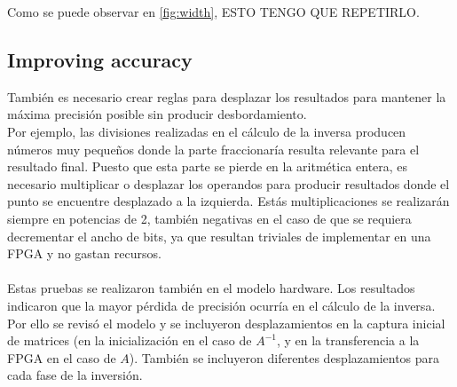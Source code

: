 Como se puede observar en \autoref{fig:width}, ESTO TENGO QUE REPETIRLO.
\\

\subsection{Improving accuracy}
También es necesario crear reglas para desplazar los resultados para mantener la máxima precisión posible sin producir desbordamiento.
\\
Por ejemplo, las divisiones realizadas en el cálculo de la inversa producen números muy pequeños donde la parte fraccionaría resulta relevante para el resultado final. Puesto que esta parte se pierde en la aritmética entera, es necesario multiplicar o desplazar los operandos para producir resultados donde el punto se encuentre desplazado a la izquierda. Estás multiplicaciones se realizarán siempre en potencias de 2, también negativas en el caso de que se requiera decrementar el ancho de bits, ya que resultan triviales de implementar en una FPGA y no gastan recursos.
\\
\\
Estas pruebas se realizaron también en el modelo hardware. Los resultados indicaron que la mayor pérdida de precisión ocurría en el cálculo de la inversa. Por ello se revisó el modelo y se incluyeron desplazamientos en la captura inicial de matrices (en la inicialización en el caso de $A^{-1}$, y en la transferencia a la FPGA en el caso de $A$). También se incluyeron diferentes desplazamientos para cada fase de la inversión.


